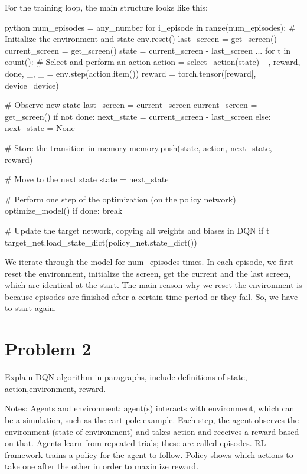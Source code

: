 \documentclass{article}
\numberwithin{equation}{section}
\numberwithin{equation}{section}
\begin{document}
For the training loop, the main structure looks like this:

\begin{mintedbox}{python}
num_episodes = any_number
for i_episode in range(num_episodes):
    # Initialize the environment and state
    env.reset()
    last_screen = get_screen()
    current_screen = get_screen()
    state = current_screen - last_screen
	...
	for t in count():
        # Select and perform an action
        action = select_action(state)
        _, reward, done, _, _ = env.step(action.item())
        reward = torch.tensor([reward], device=device)

        # Observe new state
        last_screen = current_screen
        current_screen = get_screen()
        if not done:
            next_state = current_screen - last_screen
        else:
            next_state = None

        # Store the transition in memory
        memory.push(state, action, next_state, reward)

        # Move to the next state
        state = next_state

        # Perform one step of the optimization (on the policy network)
        optimize_model()
        if done:
            break

        # Update the target network, copying all weights and biases in DQN
        if t %
            target_net.load_state_dict(policy_net.state_dict())
\end{mintedbox}

We iterate through the model for num_episodes times. In each episode, we first reset the environment, initialize the screen, get the current and the last screen, which are identical at the start. The main reason why we reset the environment is because episodes are finished after a certain time period or they fail. So, we have to start again. 



\section{Problem 2}
Explain DQN algorithm in paragraphs, include definitions of state, action,environment, reward.

Notes: Agents and environment: agent(s) interacts with environment, which can be a simulation, such as the cart pole example. Each step, the agent observes the environment (state of environment) and takes action and receives a reward based on that. Agents learn from repeated trials; these are called episodes. RL framework trains a policy for the agent to follow. Policy shows which actions to take one after the other in order to maximize reward. \\
\end{document}
